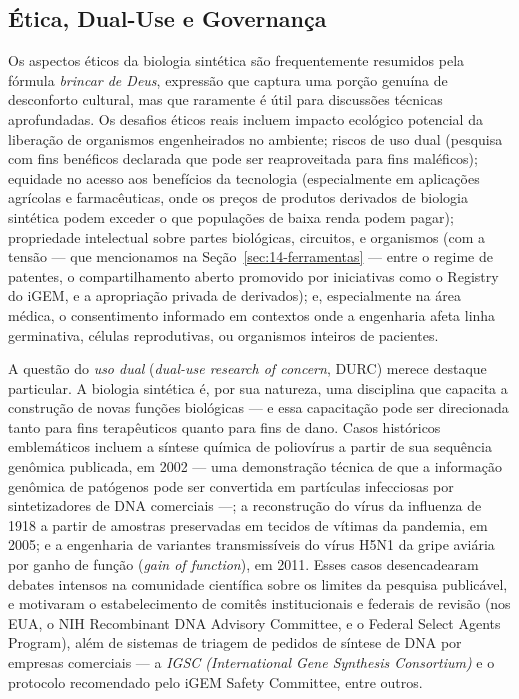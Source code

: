 \subsection{Ética, Dual-Use e Governança}

Os aspectos éticos da biologia sintética são frequentemente resumidos pela fórmula \emph{brincar de Deus}, expressão que captura uma porção genuína de desconforto cultural, mas que raramente é útil para discussões técnicas aprofundadas. Os desafios éticos reais incluem impacto ecológico potencial da liberação de organismos engenheirados no ambiente; riscos de uso dual (pesquisa com fins benéficos declarada que pode ser reaproveitada para fins maléficos); equidade no acesso aos benefícios da tecnologia (especialmente em aplicações agrícolas e farmacêuticas, onde os preços de produtos derivados de biologia sintética podem exceder o que populações de baixa renda podem pagar); propriedade intelectual sobre partes biológicas, circuitos, e organismos (com a tensão --- que mencionamos na Seção~\ref{sec:14-ferramentas} --- entre o regime de patentes, o compartilhamento aberto promovido por iniciativas como o Registry do iGEM, e a apropriação privada de derivados); e, especialmente na área médica, o consentimento informado em contextos onde a engenharia afeta linha germinativa, células reprodutivas, ou organismos inteiros de pacientes.

A questão do \emph{uso dual} (\emph{dual-use research of concern}, DURC) merece destaque particular. A biologia sintética é, por sua natureza, uma disciplina que capacita a construção de novas funções biológicas --- e essa capacitação pode ser direcionada tanto para fins terapêuticos quanto para fins de dano. Casos históricos emblemáticos incluem a síntese química de poliovírus a partir de sua sequência genômica publicada, em 2002 --- uma demonstração técnica de que a informação genômica de patógenos pode ser convertida em partículas infecciosas por sintetizadores de DNA comerciais ---; a reconstrução do vírus da influenza de 1918 a partir de amostras preservadas em tecidos de vítimas da pandemia, em 2005; e a engenharia de variantes transmissíveis do vírus H5N1 da gripe aviária por ganho de função (\emph{gain of function}), em 2011. Esses casos desencadearam debates intensos na comunidade científica sobre os limites da pesquisa publicável, e motivaram o estabelecimento de comitês institucionais e federais de revisão (nos EUA, o NIH Recombinant DNA Advisory Committee, e o Federal Select Agents Program), além de sistemas de triagem de pedidos de síntese de DNA por empresas comerciais --- a \emph{IGSC (International Gene Synthesis Consortium)} e o protocolo recomendado pelo iGEM Safety Committee, entre outros.

